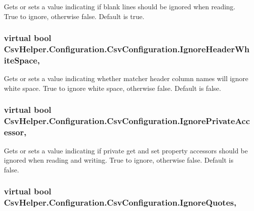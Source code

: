Gets or sets a value indicating if blank lines should be ignored when reading. True to ignore, otherwise false. Default is true. 

\hypertarget{a00043_a509e336bfd99b45feb55acddeda4df24}{
\subsubsection[{Ignore\-Header\-White\-Space}]{\setlength{\rightskip}{0pt plus 5cm}virtual bool Csv\-Helper.\-Configuration.\-Csv\-Configuration.\-Ignore\-Header\-White\-Space\hspace{0.3cm}{\ttfamily [get]}, {\ttfamily [set]}}}\label{a00043_a509e336bfd99b45feb55acddeda4df24}


Gets or sets a value indicating whether matcher header column names will ignore white space. True to ignore white space, otherwise false. Default is false. 

\hypertarget{a00043_a21b79b0f10ef0a156bd5993300d26b4d}{
\subsubsection[{Ignore\-Private\-Accessor}]{\setlength{\rightskip}{0pt plus 5cm}virtual bool Csv\-Helper.\-Configuration.\-Csv\-Configuration.\-Ignore\-Private\-Accessor\hspace{0.3cm}{\ttfamily [get]}, {\ttfamily [set]}}}\label{a00043_a21b79b0f10ef0a156bd5993300d26b4d}


Gets or sets a value indicating if private get and set property accessors should be ignored when reading and writing. True to ignore, otherwise false. Default is false. 

\hypertarget{a00043_abb9b54f3fb2aefa066598d74f01d00d8}{
\subsubsection[{Ignore\-Quotes}]{\setlength{\rightskip}{0pt plus 5cm}virtual bool Csv\-Helper.\-Configuration.\-Csv\-Configuration.\-Ignore\-Quotes\hspace{0.3cm}{\ttfamily [get]}, {\ttfamily [set]}}}\label{a00043_abb9b54f3fb2aefa066598d74f01d00d8}


